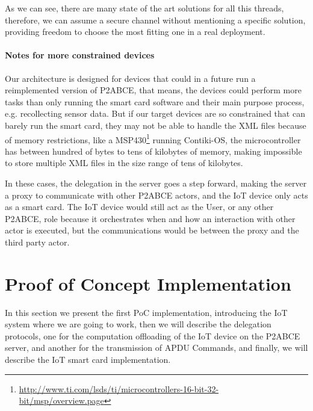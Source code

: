 As we can see, there are many state of the art solutions for all this threads, therefore, we can assume a secure channel without mentioning a specific solution, providing freedom to choose the most fitting one in a real deployment.


\paragraph{Notes for more constrained devices}

Our architecture is designed for devices that could in a future run a reimplemented version of P2ABCE, that means, the devices could perform more tasks than only running the smart card software and their main purpose process, e.g. recollecting sensor data. But if our target devices are so constrained that can barely run the smart card, they may not be able to handle the XML files because of memory restrictions, like a MSP430\footnote{\url{http://www.ti.com/lsds/ti/microcontrollers-16-bit-32-bit/msp/overview.page}} running Contiki-OS, the microcontroller has between hundred of bytes to tens of kilobytes of memory, making impossible to store multiple XML files in the size range of tens of kilobytes.

In these cases, the delegation in the server goes a step forward, making the server a proxy to communicate with other P2ABCE actors, and the IoT device only acts as a smart card. The IoT device would still act as the User, or any other P2ABCE, role because it orchestrates when and how an interaction with other actor is executed, but the communications would be between the proxy and the third party actor. 



\section{Proof of Concept Implementation}
%
%  


In this section we present the first PoC implementation, introducing the IoT system where we are going to work, then we will describe the delegation protocols, one for the computation offloading of the IoT device on the P2ABCE server, and another for the transmission of APDU Commands, and finally, we will describe the IoT smart card implementation.




